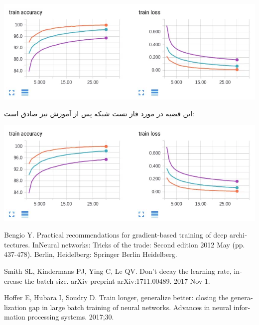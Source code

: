 \begin{qsolve}
	\begin{center}
		\includegraphics*[width=1\linewidth]{pics/img7.png}
		\label{تاثیر اندازه دسته در سرعت همگرایی آموزش}
	\end{center}
	
	این قضیه در مورد فاز تست شبکه پس از آموزش نیز صادق است:
	\begin{center}
		\includegraphics*[width=1\linewidth]{pics/img7.png}
		\label{تاثیر اندازه دسته در سرعت همگرایی آموزش}
	\end{center}
	
	
	\begin{latin}
		\begin{thebibliography}{9}
			Bengio Y. Practical recommendations for gradient-based training of deep architectures. InNeural networks: Tricks of the trade: Second edition 2012 May (pp. 437-478). Berlin, Heidelberg: Springer Berlin Heidelberg.
			
			
			Smith SL, Kindermans PJ, Ying C, Le QV. Don't decay the learning rate, increase the batch size. arXiv preprint arXiv:1711.00489. 2017 Nov 1.
			
			Hoffer E, Hubara I, Soudry D. Train longer, generalize better: closing the generalization gap in large batch training of neural networks. Advances in neural information processing systems. 2017;30.
			
		\end{thebibliography} 
	\end{latin}
\end{qsolve}




















